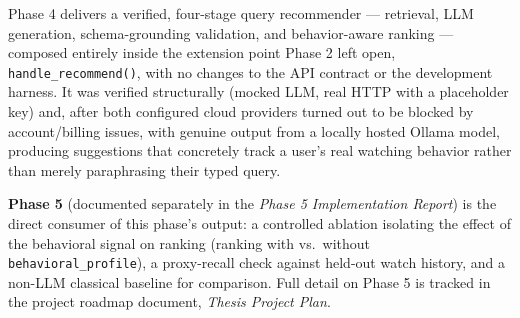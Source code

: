 \documentclass[11pt,a4paper]{article}
\newcommand{\code}[1]{\texttt{#1}}
\begin{document}
Phase 4 delivers a verified, four-stage query recommender --- retrieval, LLM generation,
schema-grounding validation, and behavior-aware ranking --- composed entirely inside the extension
point Phase 2 left open, \code{handle\_recommend()}, with no changes to the API contract or the
development harness. It was verified structurally (mocked LLM, real HTTP with a placeholder key)
and, after both configured cloud providers turned out to be blocked by account/billing issues, with
genuine output from a locally hosted Ollama model, producing suggestions that concretely track a
user's real watching behavior rather than merely paraphrasing their typed query.

\textbf{Phase 5} (documented separately in the \emph{Phase 5 Implementation Report}) is the direct
consumer of this phase's output: a controlled ablation isolating the effect of the behavioral
signal on ranking (ranking with vs.\ without \code{behavioral\_profile}), a proxy-recall check
against held-out watch history, and a non-LLM classical baseline for comparison. Full detail on
Phase 5 is tracked in the project roadmap document, \emph{Thesis Project Plan}.
\end{document}
